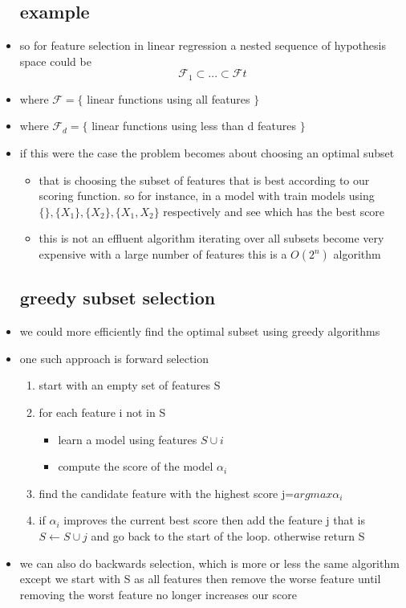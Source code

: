 \documentclass{article}
\begin{document}
\begin{itemize}
\subsection{example}
 \item so for feature selection in linear regression a nested sequence of hypothesis space could be $$\mathcal{F}_1\subset ... \subset \mathcal{F}t$$
 \item where $\mathcal{F}=\{$ linear functions using all features $\}$
 \item where $\mathcal{F}_{d}=\{$ linear functions using less than d features $\}$
\item if this were the case the problem becomes about choosing an optimal subset 
\begin{itemize}
    \item that is choosing the subset of features that is best according to our scoring function. so for instance, in a model with train models using $\{\},\{X_1\},\{X_2\},\{X_1,X_2\}$ respectively and see which has the best score
    \item this is not an effluent algorithm iterating over all subsets become very expensive with a large number of features this is a $O(2^n)$ algorithm  
\end{itemize}
\subsection{greedy subset selection}
\item we could more efficiently find the optimal subset using greedy algorithms 
\item one such approach is forward selection
\begin{enumerate}
    \item start with an empty set of features S
    \item for each feature i not in S
    \begin{itemize}
        \item learn a model using features $S\cup i$
        \item compute the score of the model $\alpha_i$
    \end{itemize}
    \item find the candidate feature with the highest score j=$argmax \alpha_i$
    \item if $\alpha_i$ improves the current best score then add the feature j that is $S\leftarrow S\cup j$ and go back to the start of the loop. otherwise return S
\end{enumerate}
\item we can also do backwards selection, which is more or less the same algorithm except we start with S as all features then remove the worse feature until removing the worst feature no longer increases our score

\end{itemize}
\end{document}
